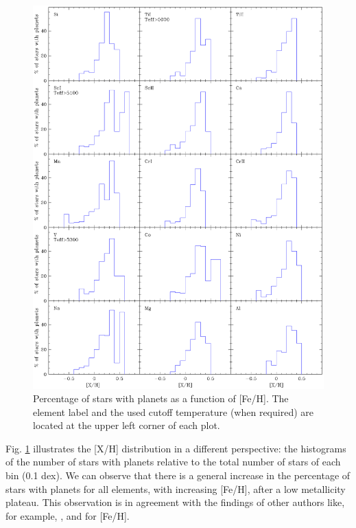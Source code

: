 \documentclass[oldversion]{aa}
\begin{document}
\begin{figure}[t!]
\centering
\includegraphics[trim=0cm 1.5cm 0cm 1cm,clip,width=9 cm]{pics/histxhpercentagev2.eps}
\caption[depots]{Percentage of stars with planets as a function of [Fe/H]. The element label and the used cutoff temperature (when required) are located at the upper left corner of each plot.}
\label{fig:percent}
\end{figure}

Fig. \ref{fig:percent} illustrates the [X/H] distribution in a different perspective: the histograms of the number of stars with planets relative to the total number of stars of each bin (0.1 dex). We can observe that there is a general increase in the percentage of stars with planets for all elements, with increasing [Fe/H], after a low metallicity plateau. This observation is in agreement with the findings of other authors like, for example, \citet{Santos-2001a, Santos-2004b}, and \citet{Fischer-2005} for [Fe/H]. %
\end{document}
